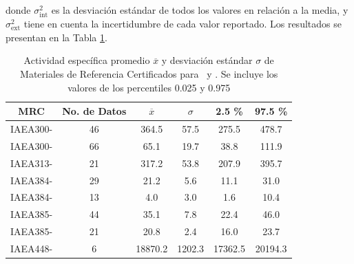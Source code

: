 donde $\sigma^2_\text{int}$ es la desviación estándar de todos los valores en relación a la media, y $\sigma^2_\text{ext}$ tiene en cuenta la incertidumbre de cada valor reportado. Los resultados se presentan en la Tabla \ref{Table-MRC}. 
\begin{table}
\centering
\caption{Actividad específica promedio $\overline{x}$ y desviación estándar $\sigma$ de Materiales de Referencia Certificados para \PbCero\, y \PbCuatro. Se incluye los valores de los percentiles 0.025 y 0.975}\label{Table-MRC}
\begin{tabular}{|c|c|c|c|c|c|}
\hline													
\rowcolor{Blue2}	MRC	&	No. de Datos	&	$\overline{x}$	&	$\sigma$	&	2.5 \% 	&	97.5 \% 	\\ 	\hline
\rowcolor{Blue1}	IAEA300-\PbCero	&	46	&	364.5	&	57.5	&	275.5	&	478.7	\\ 	
\rowcolor{Blue1}	IAEA300-\PbCuatro	&	66	&	65.1	&	19.7	&	38.8	&	111.9	\\ 	
\hline
\rowcolor{Blue1}	IAEA313-\PbCuatro	&	21	&	317.2	&	53.8	&	207.9	&	395.7	\\ 	
\hline
\rowcolor{Blue1}	IAEA384-\PbCero	&	29	&	21.2	&	5.6	&	11.1	&	31.0	\\ 	
\rowcolor{Blue1}	IAEA384-\PbCuatro	&	13	&	4.0	&	3.0	&	1.6	&	10.4	\\ 	
\hline
\rowcolor{Blue1}	IAEA385-\PbCero	&	44	&	35.1	&	7.8	&	22.4	&	46.0	\\ 	
\rowcolor{Blue1}	IAEA385-\PbCuatro	&	21	&	20.8	&	2.4	&	16.0	&	23.7	\\ 	
\hline
\rowcolor{Blue1}	IAEA448-\PbCuatro	&	6	&	18870.2	&	1202.3	&	17362.5	&	20194.3	\\ 	\hline
\end{tabular}
\end{table}
